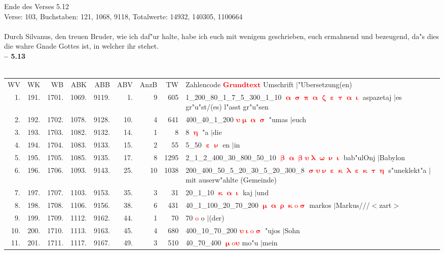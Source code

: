 \documentclass[a4paper,10pt,landscape]{article}
\begin{document}
Ende des Verses 5.12\\
Verse: 103, Buchstaben: 121, 1068, 9118, Totalwerte: 14932, 140305, 1100664\\
\\
Durch Silvanus, den treuen Bruder, wie ich daf"ur halte, habe ich euch mit wenigem geschrieben, euch ermahnend und bezeugend, da"s dies die wahre Gnade Gottes ist, in welcher ihr stehet.\\
\newpage 
{\bf -- 5.13}\\
\medskip \\
\begin{tabular}{rrrrrrrrp{120mm}}
WV&WK&WB&ABK&ABB&ABV&AnzB&TW&Zahlencode \textcolor{red}{$\boldsymbol{Grundtext}$} Umschrift $|$"Ubersetzung(en)\\
1.&191.&1701.&1069.&9119.&1.&9&605&1\_200\_80\_1\_7\_5\_300\_1\_10 \textcolor{red}{$\boldsymbol{\upalpha\upsigma\uppi\upalpha\upzeta\upepsilon\uptau\upalpha\upiota}$} aspazetaj $|$es gr"u"st/(es) l"asst gr"u"sen\\
2.&192.&1702.&1078.&9128.&10.&4&641&400\_40\_1\_200 \textcolor{red}{$\boldsymbol{\upsilon\upmu\upalpha\upsigma}$} "umas $|$euch\\
3.&193.&1703.&1082.&9132.&14.&1&8&8 \textcolor{red}{$\boldsymbol{\upeta}$} "a $|$die\\
4.&194.&1704.&1083.&9133.&15.&2&55&5\_50 \textcolor{red}{$\boldsymbol{\upepsilon\upnu}$} en $|$in\\
5.&195.&1705.&1085.&9135.&17.&8&1295&2\_1\_2\_400\_30\_800\_50\_10 \textcolor{red}{$\boldsymbol{\upbeta\upalpha\upbeta\upsilon\uplambda\upomega\upnu\upiota}$} bab"ulOnj $|$Babylon\\
6.&196.&1706.&1093.&9143.&25.&10&1038&200\_400\_50\_5\_20\_30\_5\_20\_300\_8 \textcolor{red}{$\boldsymbol{\upsigma\upsilon\upnu\upepsilon\upkappa\uplambda\upepsilon\upkappa\uptau\upeta}$} s"uneklekt"a $|$mit auserw"ahlte (Gemeinde)\\
7.&197.&1707.&1103.&9153.&35.&3&31&20\_1\_10 \textcolor{red}{$\boldsymbol{\upkappa\upalpha\upiota}$} kaj $|$und\\
8.&198.&1708.&1106.&9156.&38.&6&431&40\_1\_100\_20\_70\_200 \textcolor{red}{$\boldsymbol{\upmu\upalpha\uprho\upkappa\mathrm{o}\upsigma}$} markos $|$Markus///$<$zart$>$\\
9.&199.&1709.&1112.&9162.&44.&1&70&70 \textcolor{red}{$\boldsymbol{\mathrm{o}}$} o $|$(der)\\
10.&200.&1710.&1113.&9163.&45.&4&680&400\_10\_70\_200 \textcolor{red}{$\boldsymbol{\upsilon\upiota\mathrm{o}\upsigma}$} "ujos $|$Sohn\\
11.&201.&1711.&1117.&9167.&49.&3&510&40\_70\_400 \textcolor{red}{$\boldsymbol{\upmu\mathrm{o}\upsilon}$} mo"u $|$mein\\
\end{tabular}\medskip \\
\end{document}

